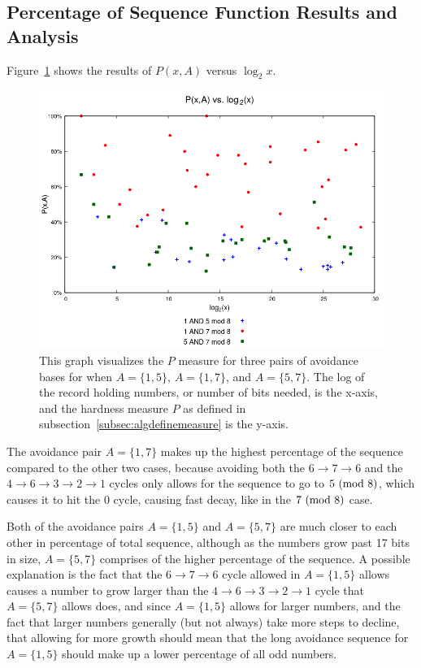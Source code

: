 \subsection{Percentage of Sequence Function Results and Analysis} \label{subsubsec:algmulpercentage}
Figure~\ref{fig:p_multi_vslog} shows the results of $P(x,A)$ versus $\log_2{x}$.\par
\begin{figure}
    \centering
    \includegraphics[scale=0.75]{ModAvoidanceAnalysisPics/P_vs_log_multi_base.png}
    \caption{This graph visualizes the $P$ measure for three pairs of avoidance bases for when $A = \{1,5\}$, $A= \{1,7\}$, and $A = \{5,7\}$. The log of the record holding numbers, or number of bits needed, is the x-axis, and the hardness measure $P$ as defined in subsection~\ref{subsec:algdefinemeasure} is the y-axis.}
    \label{fig:p_multi_vslog}
\end{figure}
The avoidance pair $A= \{1,7\}$ makes up the highest percentage of the sequence compared to the other two cases, because avoiding both the $6 \rightarrow 7 \rightarrow 6$ and the $4 \rightarrow 6 \rightarrow 3 \rightarrow 2 \rightarrow 1$ cycles only allows for the sequence to go to $5\ (\mathrm{mod}\ 8)$, which causes it to hit the 0 cycle, causing fast decay, like in the $7\ (\mathrm{mod}\ 8)$ case. \par
Both of the avoidance pairs $A= \{1,5\}$ and $A= \{5,7\}$ are much closer to each other in percentage of total sequence, although as the numbers grow past 17 bits in size, $A= \{5,7\}$ comprises of the higher percentage of the sequence. A possible explanation is the fact that the $6 \rightarrow 7 \rightarrow 6$ cycle allowed in $A = \{1,5\}$ allows causes a number to grow larger than the $4 \rightarrow 6 \rightarrow 3 \rightarrow 2 \rightarrow 1$ cycle that $A= \{5,7\}$ allows does, and since $A = \{1,5\}$ allows for larger numbers, and the fact that larger numbers generally (but not always) take more steps to decline, that allowing for more growth should mean that the long avoidance sequence for $A = \{1,5\}$ should make up a lower percentage of all odd numbers.

